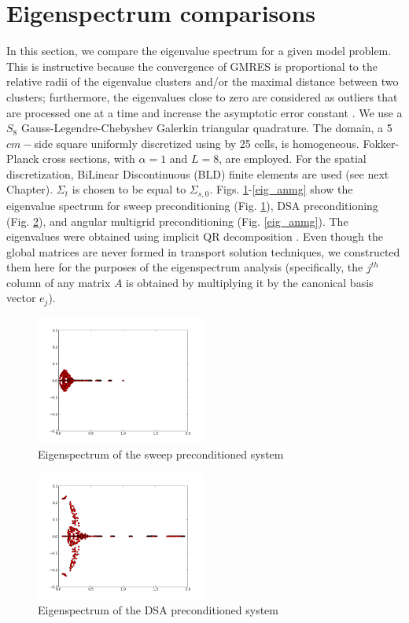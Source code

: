 \section{Eigenspectrum comparisons}
In this section, we compare the eigenvalue spectrum for a given model problem.
This is instructive because the convergence of GMRES is proportional to the
relative radii of the eigenvalue clusters and/or the maximal distance between
two clusters; furthermore, the eigenvalues close to zero are considered as
outliers that are processed one at a time and increase the asymptotic error
constant \cite{campbell}.  We use a $S_8$ Gauss-Legendre-Chebyshev Galerkin
triangular quadrature. The domain, a 5$cm-$side square uniformly discretized
using by 25 cells, is homogeneous. Fokker-Planck cross sections, with
$\alpha=1$ and $L=8$, are employed. For the spatial discretization, BiLinear
Discontinuous (BLD) finite elements are used (see next Chapter). $\Sigma_t$ 
is chosen to be equal to $\Sigma_{s,0}$. Figs. \ref{eig_sweep}-\ref{eig_anmg} 
show the eigenvalue spectrum for sweep preconditioning (Fig. \ref{eig_sweep}), 
DSA preconditioning (Fig. \ref{eig_dsa}), and angular multigrid preconditioning
(Fig. \ref{eig_anmg}). The eigenvalues were obtained using implicit QR
decomposition \cite{implicitQR}. Even though the global matrices are never
formed in transport solution techniques, we constructed them here for the
purposes of the eigenspectrum analysis (specifically, the $j^{th}$ column of
any matrix $A$ is obtained by multiplying it by the canonical basis vector
$e_j$).
\begin{figure}[H]
  \centering
  \includegraphics[width=0.5\textwidth]{./Anmg/red_eig_gmres}
  \caption{Eigenspectrum of the sweep preconditioned system}
  \label{eig_sweep}
\end{figure}
\begin{figure}[H]
  \centering
  \includegraphics[width=0.5\textwidth]{./Anmg/red_eig_dsa}
  \caption{Eigenspectrum of the DSA preconditioned system}
  \label{eig_dsa}
\end{figure}
